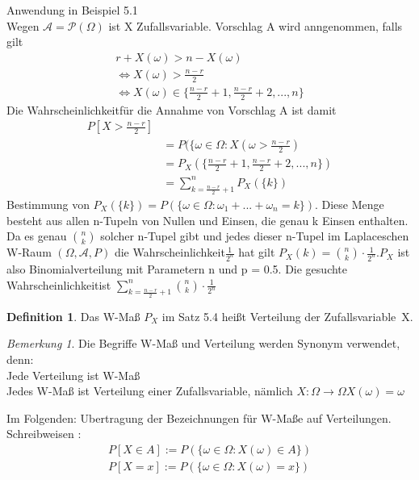 \documentclass[a4paper,12pt,fleqn]{scrartcl}
\newcommand{\m}[1]{\mathcal{ #1 }}
\newcommand{\Wk}{Wahrscheinlichkeit}
\newcommand{\ZV}{Zufallsvariable}
\theoremstyle{definition}
\newtheorem{definition}{Definition}[section]
\theoremstyle{plain}
\theoremstyle{remark}
\newtheorem*{bemerkung}{Bemerkung}
\begin{document}
Anwendung in Beispiel 5.1 \\
Wegen $\m{A} = \m{P}( \Omega) $ ist X \ZV. Vorschlag A wird anngenommen, falls gilt
\begin{align*}
r + X(\omega) > n - X( \omega ) \\
\Leftrightarrow X( \omega) > \frac{n-r}{2} \\
\Leftrightarrow X( \omega) \in \{ \frac{n-r}{2}+1,\frac{n-r}{2}+2,...,n \}
\end{align*}  
Die \Wk für die Annahme von Vorschlag A ist damit 
\begin{align*}
P[X > \frac{n-r}{2} ] \\
&= P( \{ \omega \in \Omega : X( \omega >  \frac{n-r}{2}) \\
&= P_X( \{ \frac{n-r}{2}+1,\frac{n-r}{2}+2,...,n \} ) \\
&= \sum_{k = \frac{n-r}{2}+1}^n {P_X( \{ k \} )}
\end{align*}  
Bestimmung von $P_X( \{ k \} ) = P( \{ \omega \in \Omega : \omega_1 + ... + \omega_n = k \} )$.  Diese Menge besteht aus allen n-Tupeln von Nullen und Einsen, die genau k Einsen enthalten. Da es genau  $\binom{n}{k}$   solcher n-Tupel gibt und jedes dieser n-Tupel im Laplaceschen W-Raum  $( \Omega , \m{A} , P)$ die \Wk $\frac{1}{2^n}$ hat gilt $P_X(k) = \binom{n}{k} \cdot \frac{1}{2^n}. P_X$  ist also Binomialverteilung mit Parametern n und p = 0.5. Die gesuchte \Wk ist $\sum_{k= \frac{n-r}{2} +1}^n{\binom{n}{k} \cdot \frac{1}{2^n}}$

\begin{definition}
Das W-Maß $P_X$ im Satz 5.4 heißt Verteilung der \ZV  \ X.
\end{definition}

\begin{bemerkung}
Die Begriffe W-Maß und Verteilung werden Synonym verwendet, denn: \\
Jede Verteilung ist W-Maß \\
Jedes W-Maß ist Verteilung einer \ZV, nämlich $X: \Omega \rightarrow \Omega X( \omega) = \omega $
\end{bemerkung}
Im Folgenden: Ubertragung der Bezeichnungen für W-Maße auf Verteilungen. \\
Schreibweisen : 
\begin{align*}
P[X \in A] := P( \{ \omega \in \Omega : X(\omega ) \in A \} ) \\
P[X = x] := P( \{ \omega \in \Omega : X(\omega ) = x \} )
\end{align*}
\end{document}
